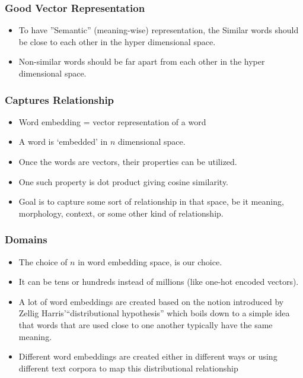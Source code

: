 \begin{frame}[fragile]\frametitle{Good Vector Representation}
\begin{itemize}
\item To have ''Semantic'' (meaning-wise) representation, the Similar words should be close to each other in the hyper dimensional space.
\item Non-similar words should be far apart from each other in the hyper dimensional space.
\end{itemize}
\end{frame}

\begin{frame}[fragile]\frametitle{Captures Relationship}
  \begin{itemize}
    \item Word embedding = vector representation of a word
	\item A word is `embedded' in $n$ dimensional space.
	\item Once the words are vectors, their properties can be utilized.
	\item One such property is dot product giving cosine similarity.
	\item Goal is to capture some sort of relationship in that space, be it meaning, morphology, context, or some other kind of relationship.
  \end{itemize}


\end{frame}

\begin{frame}[fragile]\frametitle{Domains}
  \begin{itemize}
    \item The choice of $n$ in word embedding space, is our choice.
	\item It can be tens or hundreds instead of millions (like one-hot encoded vectors).
	\item A lot of word embeddings are created based on the notion introduced by Zellig Harris'``distributional hypothesis'' which boils down to a simple idea that words that are used close to one another typically have the same meaning.
	\item Different word embeddings are created either in different ways or using different text corpora to map this distributional relationship
  \end{itemize}


\end{frame}


